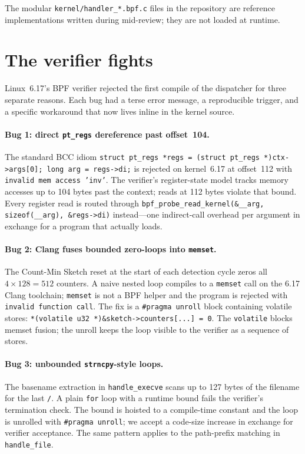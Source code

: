 The modular \texttt{kernel/handler\_*.bpf.c} files in the repository are
reference implementations written during mid-review; they are not loaded at
runtime.

\section{The verifier fights}
\label{sec:verifier}

Linux~6.17's BPF verifier rejected the first compile of the dispatcher for
three separate reasons. Each bug had a terse error message, a reproducible
trigger, and a specific workaround that now lives inline in the kernel
source.

\paragraph{Bug 1: direct \texttt{pt\_regs} dereference past offset~104.}
The standard BCC idiom
\mbox{\texttt{struct pt\_regs *regs = (struct pt\_regs *)ctx->args[0]; long
arg = regs->di;}} is rejected on kernel~6.17 at offset~112 with
\texttt{invalid mem access 'inv'}. The verifier's register-state model
tracks memory accesses up to 104 bytes past the context; reads at 112 bytes
violate that bound. Every register read is routed through
\texttt{bpf\_probe\_read\_kernel(\&\_\_arg, sizeof(\_\_arg), \&regs->di)}
instead---one indirect-call overhead per argument in exchange for a program
that actually loads.

\paragraph{Bug 2: Clang fuses bounded zero-loops into \texttt{memset}.}
The Count-Min Sketch reset at the start of each detection cycle zeros all
$4 \times 128 = 512$ counters. A naive nested loop compiles to a
\texttt{memset} call on the 6.17 Clang toolchain; \texttt{memset} is not a
BPF helper and the program is rejected with \texttt{invalid function call}.
The fix is a \texttt{\#pragma unroll} block containing volatile stores:
\mbox{\texttt{*(volatile u32 *)\&sketch->counters[...]~=~0}}. The
\texttt{volatile} blocks memset fusion; the unroll keeps the loop visible
to the verifier as a sequence of stores.

\paragraph{Bug 3: unbounded \texttt{strncpy}-style loops.}
The basename extraction in \texttt{handle\_execve} scans up to 127 bytes of
the filename for the last \texttt{/}. A plain \texttt{for} loop with a
runtime bound fails the verifier's termination check. The bound is hoisted
to a compile-time constant and the loop is unrolled with
\texttt{\#pragma unroll}; we accept a code-size increase in exchange for
verifier acceptance. The same pattern applies to the path-prefix matching
in \texttt{handle\_file}.

